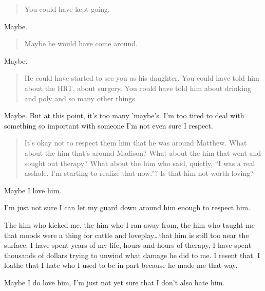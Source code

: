 \begin{quote}
You could have kept going.
\end{quote}

Maybe.

\begin{quote}
Maybe he would have come around.
\end{quote}

Maybe.

\begin{quote}
He could have started to see you as his daughter. You could have told him about the HRT, about surgery. You could have told him about drinking and poly and so many other things.
\end{quote}

Maybe. But at this point, it's too many 'maybe's. I'm too tired to deal with something so important with someone I'm not even sure I respect.

\begin{quote}
It's okay not to respect them him that he was around Matthew. What about the him that's around Madison? What about the him that went and sought out therapy? What about the him who said, quietly, ``I was a real asshole. I'm starting to realize that now.''? Is that him not worth loving?
\end{quote}

Maybe I love him.

I'm just not sure I can let my guard down around him enough to respect him.

The him who kicked me, the him who I ran away from, the him who taught me that moods were a thing for cattle and loveplay\ldots{}that him is still too near the surface. I have spent years of my life, hours and hours of therapy, I have spent thousands of dollars trying to unwind what damage he did to me. I resent that. I loathe that I hate who I used to be in part because he made me that way.

Maybe I do love him, I'm just not yet sure that I don't also hate him.
